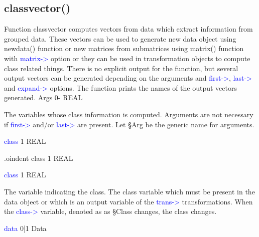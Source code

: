 \subsection{\textcolor{VioletRed}{classvector}()}
\label{classvector}
Function classvector computes vectors from data which extract information from grouped
data. These vectors can be used to generate new data object using \textcolor{VioletRed}{newdata}() function or
new matrices from submatrices using \textcolor{VioletRed}{matrix}() function with \textcolor{blue}{matrix->} option or
they can be used in transformation objects to compute class related things.
There is no explicit output for the function, but several output vectors can
be generated depending on the arguments and \textcolor{blue}{first->}, \textcolor{blue}{last->} and
\textcolor{blue}{expand->} options. The function prints the names of the output vectors generated.
\vspace{0.3cm}
\hline
\vspace{0.3cm}
\noindent Args \tabto{3cm} 0- \tabto{5cm}  REAL \tabto{7cm}
\begin{changemargin}{3cm}{0cm}
\noindent  The variables whose class information is computed. Arguments
are not necessary if \textcolor{blue}{first->} and/or \textcolor{blue}{last->} are present.
Let §Arg be the generic name for arguments.
\end{changemargin}
\vspace{0.3cm}
\hline
\vspace{0.3cm}
\noindent \textcolor{blue}{class} \tabto{3cm} 1 \tabto{5cm}  REAL \tabto{7cm}
\begin{changemargin}{3cm}{0cm}
\noindent  .oindent class \tabto{3cm} 1 \tabto{5cm}  REAL \tabto{7cm}
\end{changemargin}
\vspace{0.3cm}
\hline
\vspace{0.3cm}
\noindent \textcolor{blue}{class} \tabto{3cm} 1 \tabto{5cm}  REAL \tabto{7cm}
\begin{changemargin}{3cm}{0cm}
\noindent The variable indicating the class. The class variable which must be present in the data object or which is
an output variable of the \textcolor{blue}{trans->} transformations.
When the \textcolor{blue}{class->} variable, denoted as
as §Class changes,
the class changes.
\end{changemargin}
\vspace{0.3cm}
\hline
\vspace{0.3cm}
\noindent \textcolor{blue}{data} \tabto{3cm} 0|1 \tabto{5cm}  Data \tabto{7cm}
